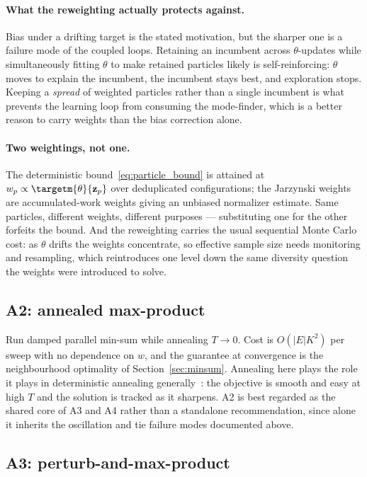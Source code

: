 \paragraph{What the reweighting actually protects against.} Bias under a drifting target is the stated motivation, but the sharper one is a failure mode of the coupled loops. Retaining an incumbent across $\theta$-updates while simultaneously fitting $\theta$ to make retained particles likely is self-reinforcing: $\theta$ moves to explain the incumbent, the incumbent stays best, and exploration stops. Keeping a \emph{spread} of weighted particles rather than a single incumbent is what prevents the learning loop from consuming the mode-finder, which is a better reason to carry weights than the bias correction alone.

\paragraph{Two weightings, not one.} The deterministic bound~\eqref{eq:particle_bound} is attained at $w_p \propto \targetm{\theta}{\mathbf{z}_p}$ over deduplicated configurations; the Jarzynski weights are accumulated-work weights giving an unbiased normalizer estimate. Same particles, different weights, different purposes --- substituting one for the other forfeits the bound. And the reweighting carries the usual sequential Monte Carlo cost: as $\theta$ drifts the weights concentrate, so effective sample size needs monitoring and resampling, which reintroduces one level down the same diversity question the weights were introduced to solve.

\subsection{A2: annealed max-product}

Run damped parallel min-sum while annealing $T \rightarrow 0$. Cost is $O(\lvert E \rvert K^2)$ per sweep with no dependence on $w$, and the guarantee at convergence is the neighbourhood optimality of Section~\ref{sec:minsum}. Annealing here plays the role it plays in deterministic annealing generally~\citep{Rose1998}: the objective is smooth and easy at high $T$ and the solution is tracked as it sharpens. A2 is best regarded as the shared core of A3 and A4 rather than a standalone recommendation, since alone it inherits the oscillation and tie failure modes documented above.

\subsection{A3: perturb-and-max-product}


